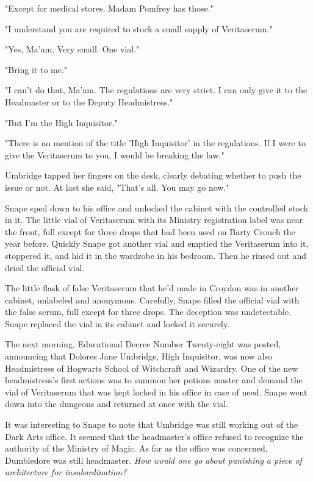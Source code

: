 \documentclass[a4paper,11pt]{article}
\begin{document}
"Except for medical stores. Madam Pomfrey has those."

"I understand you are required to stock a small supply of Veritaserum."

"Yes, Ma'am. Very small. One vial."

"Bring it to me."

"I can't do that, Ma'am. The regulations are very strict. I can only give it to the Headmaster or to the Deputy Headmistress."

"But I'm the High Inquisitor."

"There is no mention of the title 'High Inquisitor' in the regulations. If I were to give the Veritaserum to you, I would be breaking the law."

Umbridge tapped her fingers on the desk, clearly debating whether to push the issue or not. At last she said, "That's all. You may go now."

Snape sped down to his office and unlocked the cabinet with the controlled stock in it. The little vial of Veritaserum with its Ministry registration label was near the front, full except for three drops that had been used on Barty Crouch the year before. Quickly Snape got another vial and emptied the Veritaserum into it, stoppered it, and hid it in the wardrobe in his bedroom. Then he rinsed out and dried the official vial.

The little flask of false Veritaserum that he'd made in Croydon was in another cabinet, unlabeled and anonymous. Carefully, Snape filled the official vial with the false serum, full except for three drops. The deception was undetectable. Snape replaced the vial in its cabinet and locked it securely.

The next morning, Educational Decree Number Twenty-eight was posted, announcing that Dolores Jane Umbridge, High Inquisitor, was now also Headmistress of Hogwarts School of Witchcraft and Wizardry. One of the new headmistress's first actions was to summon her potions master and demand the vial of Veritaserum that was kept locked in his office in case of need. Snape went down into the dungeons and returned at once with the vial.

It was interesting to Snape to note that Umbridge was still working out of the Dark Arts office. It seemed that the headmaster's office refused to recognize the authority of the Ministry of Magic. As far as the office was concerned, Dumbledore was still headmaster. \emph{How would one go about punishing a piece of architecture for insubordination?}
\end{document}
